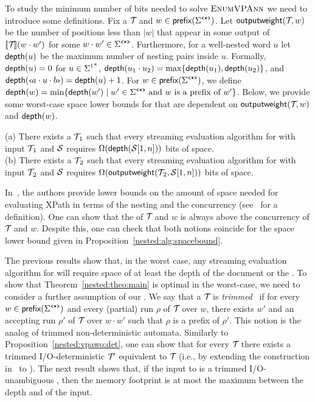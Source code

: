 To study the minimum number of bits needed to solve $\textsc{EnumVPAnn}$ we need to introduce some definitions.
Fix a \vpann $\mathcal{T}\!$ and $w \in \textsf{prefix}(\Sigma^{\texttt{<*>}})$. Let 
$\mathsf{outputweight}(\mathcal{T}\!, w)$ be the number of positions less than $|w|$ that appear in some output of ${\llbracket{\mathcal{T}\!}\rrbracket}(w\cdot w')$ for some $w\cdot w'\in \Sigma^{\texttt{<*>}}$. 
Furthermore, for a well-nested word $u$ let $\mathsf{depth}(u)$ be the maximum number of nesting pairs inside $u$. Formally, $\mathsf{depth}(u) = 0$ for $u \in  {\Sigma^{\texttt{|}}}^*$, $\mathsf{depth}(u_1 \cdot u_2) = \max\{\mathsf{depth}(u_1), \mathsf{depth}(u_2)\}$, and $\mathsf{depth}({\scriptsize\texttt{<}} a\cdot u\cdot b{\scriptsize\texttt{>}}) = \mathsf{depth}(u) + 1$. For $w \in \textsf{prefix}(\Sigma^{\texttt{<*>}})$, we define $\mathsf{depth}(w) = \min\{\mathsf{depth}(w') \mid w'\in \Sigma^{\texttt{<*>}} \text{ and } w \text{ is a prefix of } w'\}$.
Below, we provide some worst-case space lower bounds for \enumvpann{} that are dependent on $\mathsf{outputweight}(\mathcal{T}\!, w)$ and $\mathsf{depth}(w)$.
\begin{proposition}\label{nested:alg:spacebound} (a) There exists a \vpann $\mathcal{T}\!_1$ such that every streaming evaluation algorithm for \enumvpann{} with input $\mathcal{T}\!_1$ and $\mathcal{S}$ requires $\Omega(\mathsf{depth}(\mathcal{S}[1, n]))$ bits of space.\\ (b) There exists a \vpann $\mathcal{T}\!_2$ such that every streaming evaluation algorithm for \enumvpann{} with input $\mathcal{T}\!_2$ and $\mathcal{S}$ requires $\Omega(\mathsf{outputweight}(\mathcal{T}\!_2, \mathcal{S}[1, n]))$ bits of space.
\end{proposition}



In~\cite{BarYossefFJ05,BarYossefFJ07}, the authors provide lower bounds on the amount of space needed for evaluating XPath in terms of the nesting and the concurrency (see~\cite{BarYossefFJ05} for a definition). 
One can show that  the \ogapname of $\mathcal{T}\!$ and $w$ is always above the concurrency of $\mathcal{T}\!$ and $w$. Despite this, one can check that both notions coincide for the space lower bound given in Proposition~\ref{nested:alg:spacebound}.

The previous results show that, in the worst case, any streaming evaluation algorithm for \vpann will require space of at least the depth of the document or the \ogapname.
To show that Theorem~\ref{nested:theo:main} is optimal in the worst-case, we need to consider a further assumption of our \vpann. We say that a \vpann $\mathcal{T}\!$ is \emph{trimmed}~\cite{caralp2015trimming} if for every $w\in \textsf{prefix}(\Sigma^{\texttt{<*>}})$ and every (partial) run $\rho$ of $\mathcal{T}\!$ over $w$, there exists $w'$ and an accepting run $\rho'$ of $\mathcal{T}\!$ over $w \cdot w'$ such that $\rho$ is a prefix of $\rho'$. 
This notion is the analog of trimmed non-deterministic automata. Similarly to Proposition~\ref{nested:vpawo:det}, one can show that for every \vpann $\mathcal{T}\!$ there exists a trimmed I/O-deterministic \vpann $\mathcal{T}\!'$ equivalent to $\mathcal{T}\!$ (i.e., by extending the construction in~\cite{caralp2015trimming} to \vpann). 
The next result shows that, if the input to \enumvpann{} is a trimmed I/O-unambiguous \vpann, then the memory footprint is at most the maximum between the depth and \ogapname of the input. 

